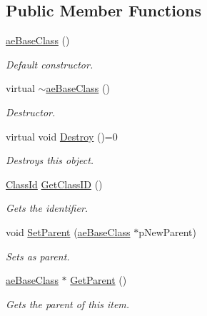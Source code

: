 \subsection*{Public Member Functions}
\begin{DoxyCompactItemize}
\item 
\hyperlink{classae_base_class_a950b98d9d33b3b6aefb6ada8d42d080e}{ae\+Base\+Class} ()\hypertarget{classae_base_class_a950b98d9d33b3b6aefb6ada8d42d080e}{}\label{classae_base_class_a950b98d9d33b3b6aefb6ada8d42d080e}

\begin{DoxyCompactList}\small\item\em Default constructor. \end{DoxyCompactList}\item 
virtual \hyperlink{classae_base_class_ae6d0c4d413b54974121c683b26837df5}{$\sim$ae\+Base\+Class} ()\hypertarget{classae_base_class_ae6d0c4d413b54974121c683b26837df5}{}\label{classae_base_class_ae6d0c4d413b54974121c683b26837df5}

\begin{DoxyCompactList}\small\item\em Destructor. \end{DoxyCompactList}\item 
virtual void \hyperlink{classae_base_class_a8494fd89ce504af1b99de8cc8745f263}{Destroy} ()=0\hypertarget{classae_base_class_a8494fd89ce504af1b99de8cc8745f263}{}\label{classae_base_class_a8494fd89ce504af1b99de8cc8745f263}

\begin{DoxyCompactList}\small\item\em Destroys this object. \end{DoxyCompactList}\item 
\hyperlink{_base_class_8h_aded8224779c70fab5084220935d672bb}{Class\+Id} \hyperlink{classae_base_class_a9459c8bf81682fca6e12e1d85218c867}{Get\+Class\+ID} ()
\begin{DoxyCompactList}\small\item\em Gets the identifier. \end{DoxyCompactList}\item 
void \hyperlink{classae_base_class_aa53bf580448bdd8b7150974bf2bc195c}{Set\+Parent} (\hyperlink{classae_base_class}{ae\+Base\+Class} $\ast$p\+New\+Parent)
\begin{DoxyCompactList}\small\item\em Sets as parent. \end{DoxyCompactList}\item 
\hyperlink{classae_base_class}{ae\+Base\+Class} $\ast$ \hyperlink{classae_base_class_aa045d5ebc0492ccf0e1fc61083228fc5}{Get\+Parent} ()
\begin{DoxyCompactList}\small\item\em Gets the parent of this item. \end{DoxyCompactList}\end{DoxyCompactItemize}
